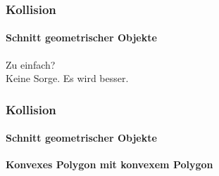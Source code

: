 \documentclass[dvips,12pt,xcolor=table]{beamer}
\begin{document}
\begin{frame}
\frametitle{Kollision}
\framesubtitle{Schnitt geometrischer Objekte}
\begin{center}
{\LARGE Zu einfach?} \\
\vspace{0.4cm}
{\LARGE Keine Sorge. Es wird besser.}
\end{center}
\end{frame}

\begin{frame}
\frametitle{Kollision}
\framesubtitle{Schnitt geometrischer Objekte}
\textbf{Konvexes Polygon mit konvexem Polygon}

\end{frame}
\end{document}

